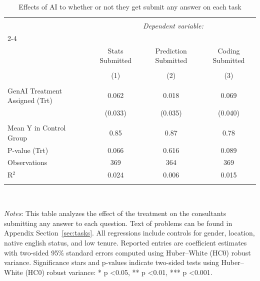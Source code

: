 
\begin{table}[!htbp] \centering 
  \caption{Effects of AI to whether or not they get submit any answer on each task} 
  \label{tab:task_finish} 
\small 
\begin{tabular}{@{\extracolsep{-5pt}}lccc} 
\\[-1.8ex]\hline 
\hline \\[-1.8ex] 
 & \multicolumn{3}{c}{\textit{Dependent variable:}} \\ 
\cline{2-4} 
\\[-1.8ex] & Stats Submitted & Prediction Submitted & Coding Submitted \\ 
\\[-1.8ex] & (1) & (2) & (3)\\ 
\hline \\[-1.8ex] 
 GenAI Treatment Assigned (Trt) & 0.062 & 0.018 & 0.069 \\ 
  & (0.033) & (0.035) & (0.040) \\ 
 \hline \\[-1.8ex] 
Mean Y in Control Group & 0.85 & 0.87 & 0.78 \\ 
P-value (Trt) & 0.066 & 0.616 & 0.089 \\ 
Observations & 369 & 364 & 369 \\ 
R$^{2}$ & 0.024 & 0.006 & 0.015 \\ 
\hline 
\hline \\[-1.8ex] 
\end{tabular}
\\
\begin{minipage}{\textwidth}
{\footnotesize \emph{Notes}: 
           This table analyzes the effect of the treatment on the consultants submitting any answer to each question.
            Text of problems can be found in Appendix Section~\ref{sec:tasks}.
           All regressions include controls for gender, location, native english status, and low tenure.
              Reported entries are coefficient estimates with two-sided 95\% standard errors computed using Huber--White (HC0) robust variance.
            Significance stars and p-values indicate two-sided tests using Huber–White (HC0) robust variance:
* p \textless 0.05, ** p \textless 0.01, *** p \textless 0.001.
          \starlanguage}
\end{minipage}
\end{table}
